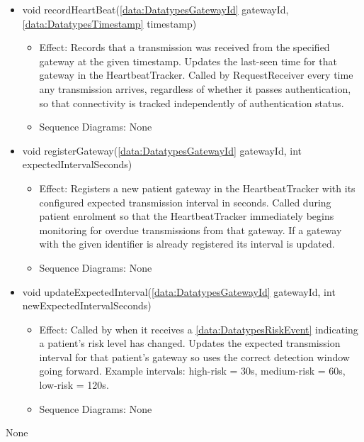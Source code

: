 \begin{description}
\begin{itemize}[noitemsep,nolistsep,leftmargin=-.25cm]
\begin{itemize}[noitemsep,nolistsep]
           \item Sequence Diagrams: \cref{diag:Interaction:Av2MissingSensorDataDetection}
        \end{itemize}
      \item \textsf{void recordHeartBeat(\ref{data:DatatypesGatewayId} gatewayId, \ref{data:DatatypesTimestamp} timestamp)}
        \begin{itemize}[noitemsep,nolistsep]
           \item Effect: Records that a transmission was received from the specified gateway at the given timestamp. Updates the last-seen time for that gateway in the HeartbeatTracker. Called by RequestReceiver every time any transmission arrives, regardless of whether it passes authentication, so that connectivity is tracked independently of authentication status. 
           \item Sequence Diagrams: None
        \end{itemize}
      \item \textsf{void registerGateway(\ref{data:DatatypesGatewayId} gatewayId, int expectedIntervalSeconds)}
        \begin{itemize}[noitemsep,nolistsep]
           \item Effect: Registers a new patient gateway in the HeartbeatTracker with its configured expected transmission interval in seconds. Called during patient enrolment so that the HeartbeatTracker immediately begins monitoring for overdue transmissions from that gateway. If a gateway with the given identifier is already registered its interval is updated. 
           \item Sequence Diagrams: None
        \end{itemize}
      \item \textsf{void updateExpectedInterval(\ref{data:DatatypesGatewayId} gatewayId, int newExpectedIntervalSeconds)}
        \begin{itemize}[noitemsep,nolistsep]
           \item Effect: Called by  when it receives a \ref{data:DatatypesRiskEvent} indicating a patient's risk level has changed. Updates the expected transmission interval for that patient's gateway so  uses the correct detection window going forward. Example intervals: high-risk = 30s, medium-risk = 60s, low-risk = 120s. 
           \item Sequence Diagrams: None
        \end{itemize}
    \end{itemize}
      \item[Diagrams:] None
    \end{description}


